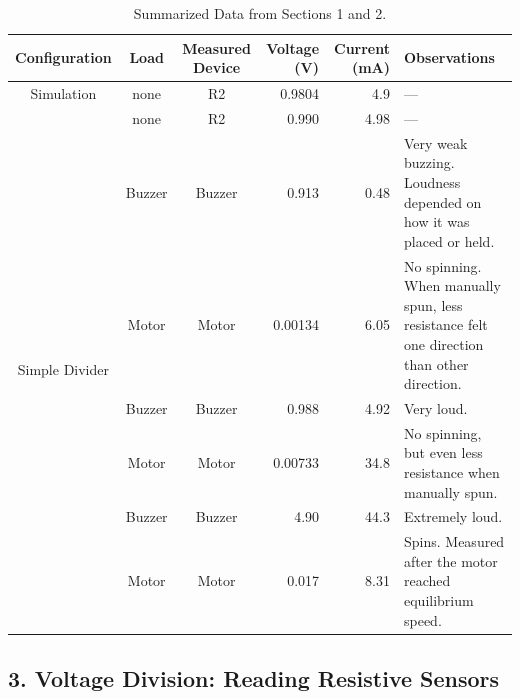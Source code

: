 \documentclass[12pt]{article}
\begin{document}
\begin{landscape}
    \begin{table}
        \centering
        \caption{Summarized Data from Sections 1 and 2.}
        \begin{tabular}{| c | c || c | r | r | p{5.5cm} |}
            \hline
            \textbf{Configuration} & \textbf{Load} & \textbf{Measured Device} & \textbf{Voltage (V)} & \textbf{Current (mA)} & \textbf{Observations}  \\
            \hline
            Simulation & none & R2 & 0.9804 & 4.9 & --- \\
    
            \hline
            \multirow{7}{*}{Simple Divider} & none & R2 & 0.990 & 4.98 & --- \\
            \cline{2-6}
    
            & Buzzer & Buzzer & 0.913 & 0.48 & Very weak buzzing. Loudness depended on how it was placed or held. \\
            \cline{2-6}
    
            & Motor & Motor & 0.00134 & 6.05 & No spinning. When manually spun, less resistance felt one direction than other direction. \\
            \cline{2-6}
            \hline
    
            \multirow{3}{*}{Voltage Follower} & Buzzer & Buzzer & 0.988 & 4.92 & Very loud. \\
            \cline{2-6}
            & Motor & Motor & 0.00733 & 34.8 & No spinning, but even less resistance when manually spun. \\
            \hline
    
            \multirow{3}{*}{FET} & Buzzer & Buzzer & 4.90 & 44.3 & Extremely loud. \\
            \cline{2-6}
            & Motor & Motor & 0.017 & 8.31 & Spins. Measured after the motor reached equilibrium speed. \\
            \hline
        \end{tabular}

        \label{tbl:measresults}
    \end{table}        
\end{landscape}

\subsection*{3. Voltage Division: Reading Resistive Sensors}
\end{document}
